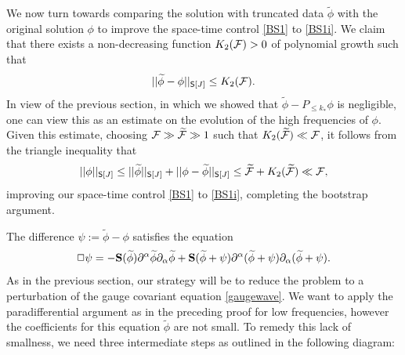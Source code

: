 We now turn towards comparing the solution with truncated data $\widetilde \phi$ with the original solution $\phi$ to improve the space-time control \eqref{BS1} to \eqref{BS1i}. We claim that there exists a non-decreasing function $K_2 (\mathcal F) > 0$ of polynomial growth such that 
	\[
		||\widetilde \phi - \phi||_{\mathsf S[J]} \leq K_2 (\mathcal F). 
	\]
In view of the previous section, in which we showed that $\widetilde \phi - P_{\leq k_*} \phi$ is negligible, one can view this as an estimate on the evolution of the high frequencies of $\phi$. Given this estimate, choosing $\mathcal F \gg \widetilde {\mathcal F} \gg 1$ such that $K_2 (\widetilde {\mathcal F}) \ll \mathcal F$, it follows from the triangle inequality that
	\[
		||\phi ||_{\mathsf S[J]} 
			\leq ||\widetilde \phi||_{\mathsf S[J]} + ||\phi - \widetilde \phi||_{\mathsf S[J]} \leq \widetilde {\mathcal F} + K_2 (\widetilde {\mathcal F}) \ll \mathcal F,
	\]
improving our space-time control \eqref{BS1} to \eqref{BS1i}, completing the bootstrap argument. 


The difference $\psi := \widetilde\phi -  \phi$ satisfies the equation
	\[
		\Box \psi
			= - {\bf S} (\widetilde \phi) \partial^\alpha \widetilde \phi \partial_\alpha \widetilde \phi + {\bf S} (\widetilde \phi + \psi) \partial^\alpha( \widetilde \phi + \psi) \partial_\alpha (\widetilde \phi + \psi).
	\]
As in the previous section, our strategy will be to reduce the problem to a perturbation of the gauge covariant equation	\eqref{gaugewave}. We want to apply the paradifferential argument as in the preceding proof for low frequencies, however the coefficients for this equation $\widetilde \phi$ are not small. To remedy this lack of smallness, we need three intermediate steps as outlined in the following diagram:

